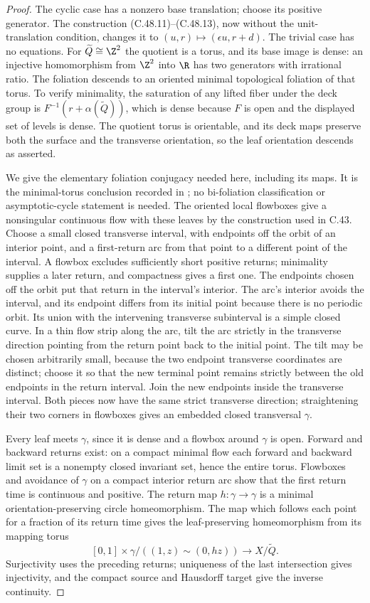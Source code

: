 \begin{proof}
The cyclic case has a nonzero base translation; choose
its positive generator. The construction
(C.48.11)--(C.48.13), now without the unit-translation
condition, changes it to $(u,r)\mapsto(\epsilon u,r+d)$.
The trivial case has no equations.
For $\widetilde Q\cong\Z^2$ the quotient is a torus,
and its base image is dense: an injective homomorphism
from $\Z^2$ into $\R$ has two generators with irrational
ratio. The foliation descends to an oriented minimal
topological foliation of that torus. To verify minimality,
the saturation of any lifted fiber under the deck group
is $F^{-1}(r+\alpha(\widetilde Q))$, which is dense because
$F$ is open and the displayed set of levels is dense.
The quotient torus is orientable, and its deck maps
preserve both the surface and the transverse orientation,
so the leaf orientation descends as asserted.

We give the elementary foliation conjugacy needed here,
including its maps. It is the minimal-torus conclusion
recorded in \cite[Proposition~2.5]{C_MionMouton2025}; no
bi-foliation classification or asymptotic-cycle statement
is needed. The oriented local flowboxes give a nonsingular
continuous flow with these leaves by the construction
used in C.43. Choose a small closed transverse interval,
with endpoints off the orbit of an interior point, and a
first-return arc from that point to a different point of
the interval. A flowbox excludes sufficiently short
positive returns; minimality supplies a later return,
and compactness gives a first one. The endpoints chosen
off the orbit put that return in the interval's interior.
The arc's interior avoids the interval, and its endpoint
differs from its initial point because there is no
periodic orbit. Its union with the intervening
transverse subinterval is a simple closed curve.
In a thin flow strip along the arc, tilt the arc strictly
in the transverse direction pointing from the return
point back to the initial point. The tilt may be chosen
arbitrarily small, because the two endpoint transverse
coordinates are distinct; choose it so that the new
terminal point remains strictly between the old
endpoints in the return interval. Join the new endpoints
inside the transverse interval. Both pieces now have
the same strict transverse direction; straightening
their two corners in flowboxes gives an embedded closed
transversal $\gamma$.

Every leaf meets $\gamma$, since it is dense and a
flowbox around $\gamma$ is open. Forward and backward
returns exist: on a compact minimal flow each forward
and backward limit set is a nonempty closed invariant
set, hence the entire torus. Flowboxes and avoidance
of $\gamma$ on a compact interior return arc show that
the first return time is continuous and positive.
The return map $h:\gamma\to\gamma$ is a minimal
orientation-preserving circle homeomorphism. The map
which follows each point for a fraction of its return
time gives the leaf-preserving homeomorphism from its
mapping torus
\[
 [0,1]\times\gamma/((1,z)\sim(0,hz))\longrightarrow X/\widetilde Q.
                                                        \tag{C.48.15}
\]
Surjectivity uses the preceding returns; uniqueness of
the last intersection gives injectivity, and the compact
source and Hausdorff target give the inverse continuity.


\end{proof}
